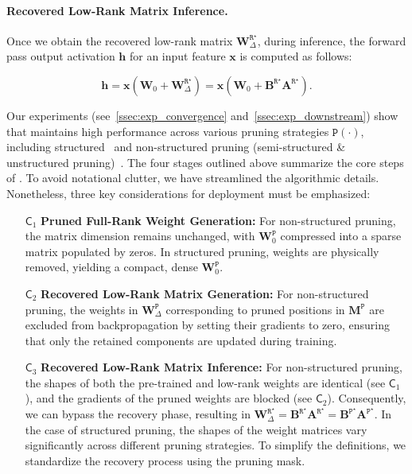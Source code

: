 \paragraph{Recovered Low-Rank Matrix Inference.}
Once we obtain the recovered low-rank matrix $\mathbf{W}_{\Delta}^{\mathtt{R}^{\star}}$, during inference, the forward pass output activation $\mathbf{h}$ for an input feature $\mathbf{x}$ is computed as follows:

\begin{equation}
\mathbf{h} 
= \mathbf{x} (\mathbf{W}_0 + \mathbf{W}_{\Delta}^{\mathtt{R}^{\star}}) = \mathbf{x} (\mathbf{W}_0 + \mathbf{B}^{\mathtt{R}^{\star}}\mathbf{A}^{\mathtt{R}^{\star}}).
\label{eq:recovered_infer}
\end{equation}

Our experiments (see~\cref{ssec:exp_convergence} and~\cref{ssec:exp_downstream}) show that \method maintains high performance across various pruning strategies $\mathtt{P}(\cdot)$, including structured~\citep{ma2023llmpruner} and non-structured pruning (semi-structured \& unstructured pruning)~\citep{FrantarA23spasegpt}. 
The four stages outlined above summarize the core steps of \method. To avoid notational clutter, we have streamlined the algorithmic details. Nonetheless, three key considerations for deployment must be emphasized:

\begin{itemize}[leftmargin=20pt]
    \item[$\mathsf{C}_1$] \textbf{Pruned Full-Rank Weight Generation:} For non-structured pruning, the matrix dimension remains unchanged, with $\mathbf{W}_0^\mathtt{P}$ compressed into a sparse matrix populated by zeros. In structured pruning, weights are physically removed, yielding a compact, dense $\mathbf{W}_0^\mathtt{P}$.

    \item[$\mathsf{C}_2$] \textbf{Recovered Low-Rank Matrix Generation:} For non-structured pruning, the weights in $\mathbf{W}_{\Delta}^\mathtt{P}$ corresponding to pruned positions in $\mathbf{M}^\mathtt{P}$ are excluded from backpropagation by setting their gradients to zero, ensuring that only the retained components are updated during training.

    \item[$\mathsf{C}_3$] \textbf{Recovered Low-Rank Matrix Inference:} 
    For non-structured pruning, the shapes of both the pre-trained and low-rank weights are identical (see $\mathsf{C}_1$), and the gradients of the pruned weights are blocked (see $\mathsf{C}_2$). 
    Consequently, we can bypass the recovery phase, resulting in $\mathbf{W}_{\Delta}^{\mathtt{R}^{\star}} =\mathbf{B}^{\mathtt{R}^{\star}}\mathbf{A}^{\mathtt{R}^{\star}}=\mathbf{B}^{\mathtt{P}^{\star}}\mathbf{A}^{\mathtt{P}^{\star}}$. 
    In the case of structured pruning, the shapes of the weight matrices vary significantly across different pruning strategies. 
    To simplify the definitions, we standardize the recovery process using the pruning mask.
\end{itemize}

